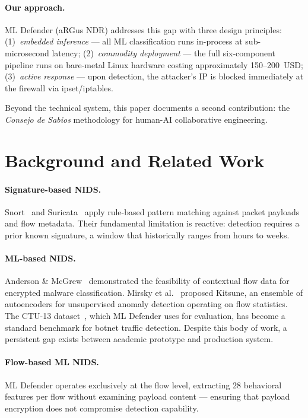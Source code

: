 \documentclass[11pt,a4paper]{article}
\begin{document}
\paragraph{Our approach.}
ML Defender (aRGus NDR) addresses this gap with three design principles:
(1)~\emph{embedded inference} --- all ML classification runs in-process at sub-microsecond
latency;
(2)~\emph{commodity deployment} --- the full six-component pipeline runs on bare-metal Linux
hardware costing approximately 150--200~USD;
(3)~\emph{active response} --- upon detection, the attacker's IP is blocked immediately at
the firewall via ipset/iptables.

Beyond the technical system, this paper documents a second contribution: the \emph{Consejo
de Sabios} methodology for human-AI collaborative engineering.

\section{Background and Related Work}

\paragraph{Signature-based NIDS.}
Snort~\cite{roesch1999} and Suricata~\cite{oisf2010} apply rule-based pattern matching
against packet payloads and flow metadata. Their fundamental limitation is reactive:
detection requires a prior known signature, a window that historically ranges from hours to
weeks.

\paragraph{ML-based NIDS.}
Anderson \& McGrew~\cite{anderson2016} demonstrated the feasibility of contextual flow data
for encrypted malware classification. Mirsky et al.~\cite{mirsky2018} proposed Kitsune, an
ensemble of autoencoders for unsupervised anomaly detection operating on flow statistics. The
CTU-13 dataset~\cite{garcia2014}, which ML Defender uses for evaluation, has become a
standard benchmark for botnet traffic detection. Despite this body of work, a persistent gap
exists between academic prototype and production system.

\paragraph{Flow-based ML NIDS.}
ML Defender operates exclusively at the flow level, extracting 28 behavioral features per
flow without examining payload content --- ensuring that payload encryption does not
compromise detection capability.
\end{document}
